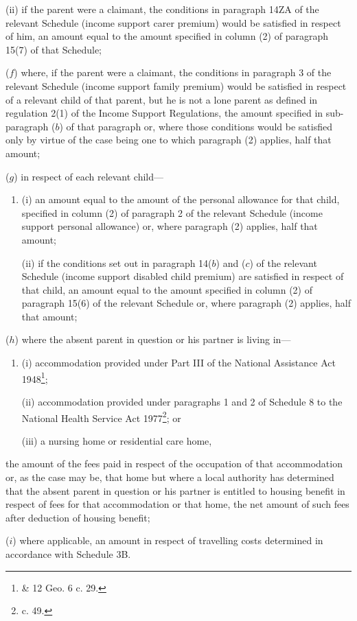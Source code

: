 \documentclass[12pt,a4paper]{article}
\begin{document}
\begin{enumerate}
\begin{enumerate}
(ii) if the parent were a claimant, the conditions in paragraph 14ZA of the relevant Schedule (income support carer premium) would be satisfied in respect of him, an amount equal to the amount specified in column (2) of paragraph 15(7) of that Schedule;
\end{enumerate}

($f$) where, if the parent were a claimant, the conditions in paragraph 3 of the relevant Schedule (income support family premium) would be satisfied in respect of a relevant child of that parent, 
but he is not a lone parent as defined in regulation 2(1) of the Income Support Regulations,  %
the amount specified in 
sub-paragraph ($b$) of  %
that paragraph or, where those conditions would be satisfied only by virtue of the case being one to which paragraph (2) applies, half that amount;

($g$) in respect of each relevant child—
\begin{enumerate}\item[]
(i) an amount equal to the amount of the personal allowance for that child, specified in column (2) of paragraph 2 of the relevant Schedule (income support personal allowance) or, where paragraph (2) applies, half that amount;

(ii) if the conditions set out in paragraph 14($b$) and ($c$) of the relevant Schedule (income support disabled child premium) are satisfied in respect of that child, an amount equal to the amount specified in column (2) of paragraph 15(6) of the relevant Schedule or, where paragraph (2) applies, half that amount;
\end{enumerate}

($h$) where the absent parent in question or his partner is living in—
\begin{enumerate}\item[]
(i) accommodation provided under Part III of the National Assistance Act 1948\footnote{ \& 12 Geo. 6 c. 29.};

(ii) accommodation provided under paragraphs 1 and 2 of Schedule 8 to the National Health Service Act 1977\footnote{ c. 49.}; or

(iii) a nursing home or residential care home,
\end{enumerate}
the amount of the fees paid in respect of the occupation of that accommodation or, as the case may be, that home
but where a local authority has determined that the absent parent in question or his partner is entitled to housing benefit in respect of fees for that accommodation or that home, the net amount of such fees after deduction of housing benefit;  %

($i$) where applicable, an amount in respect of travelling costs determined in accordance with Schedule 3B.
\end{enumerate}
\end{document}

